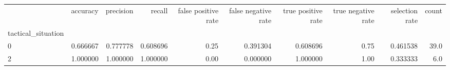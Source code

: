 \begin{tabular}{lrrrrrrrrr}
\toprule
{} &  accuracy &  precision &    recall &  false positive rate &  false negative rate &  true positive rate &  true negative rate &  selection rate &  count \\
tactical\_situation &           &            &           &                      &                      &                     &                     &                 &        \\
\midrule
0                  &  0.666667 &   0.777778 &  0.608696 &                 0.25 &             0.391304 &            0.608696 &                0.75 &        0.461538 &   39.0 \\
2                  &  1.000000 &   1.000000 &  1.000000 &                 0.00 &             0.000000 &            1.000000 &                1.00 &        0.333333 &    6.0 \\
\bottomrule
\end{tabular}
